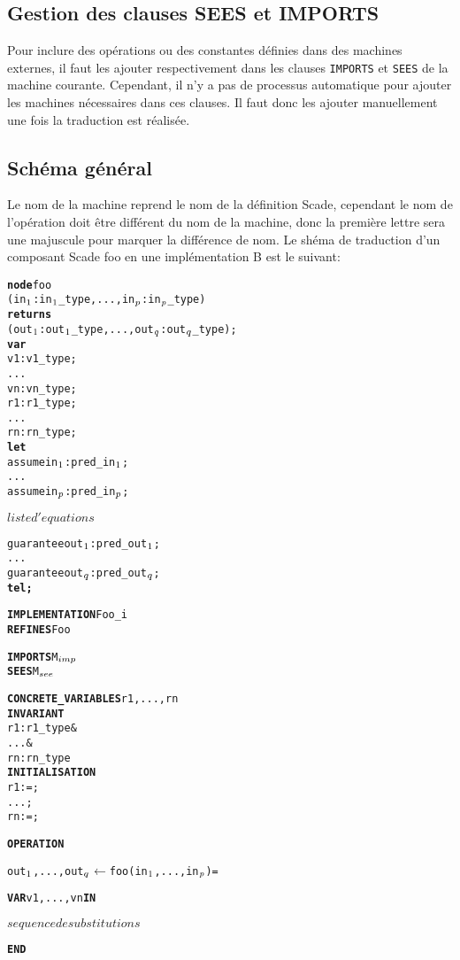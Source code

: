 \subsection{Gestion des clauses SEES et IMPORTS}
Pour inclure des opérations ou des constantes définies dans des machines
externes, il faut les ajouter respectivement dans les clauses \texttt{IMPORTS} et \texttt{SEES} de
la machine courante. Cependant, il n'y a pas de processus automatique pour
ajouter les machines nécessaires dans ces clauses. Il faut donc les ajouter
manuellement une fois la traduction est réalisée.


\subsection{Schéma général}

Le nom de la machine reprend le nom de la
définition Scade, cependant le nom de l'opération doit être différent du nom de
la machine, donc la première lettre sera une majuscule pour marquer la
différence de nom. 
Le shéma de traduction d'un composant Scade foo en une implémentation B est
le suivant:


\setlength{\columnseprule}{0.05cm}
\begin{multicols}{2}
\begin{alltt}
\textbf{node} foo 
  (in\(\sb{1}\): in\(\sb{1}\)\_type, ..., in\(\sb{p}\): in\(\sb{p}\)\_type) 
  \textbf{returns}
  (out\(\sb{1}\): out\(\sb{1}\)\_type, ..., out\(\sb{q}\): out\(\sb{q}\)\_type);
\textbf{var}
  v1 : v1\_type;
  ...
  vn : vn\_type;
  r1 : r1\_type;
  ...
  rn : rn\_type;
\textbf{let}
  assume in\(\sb{1}\) : pred\_in\(\sb{1}\);
  ...
  assume in\(\sb{p}\) : pred\_in\(\sb{p}\);

  \(liste d'equations\)

  guarantee out\(\sb{1}\) : pred\_out\(\sb{1}\);
  ...
  guarantee out\(\sb{q}\) : pred\_out\(\sb{q}\);
\textbf{tel;}
\end{alltt}

\columnbreak

\begin{alltt}
\textbf{IMPLEMENTATION} Foo_i
\textbf{REFINES} Foo

\textbf{IMPORTS} M\(\sb{imp}\)
\textbf{SEES} M\(\sb{see}\)

\textbf{CONCRETE\_VARIABLES} r1, ..., rn
\textbf{INVARIANT}
  r1 : r1\_type &
  ... &
  rn : rn\_type
\textbf{INITIALISATION}
  r1 := ;
  ... ;
  rn := ;

\textbf{OPERATION}

out\(\sb{1}\), ..., out\(\sb{q}\) \(\leftarrow\) foo(in\(\sb{1}\), ..., in\(\sb{p}\)) =
  
\textbf{VAR} v1, ..., vn \textbf{IN}
  
  \(sequence de substitutions\)

\textbf{END}
\end{alltt}
\end{multicols}

